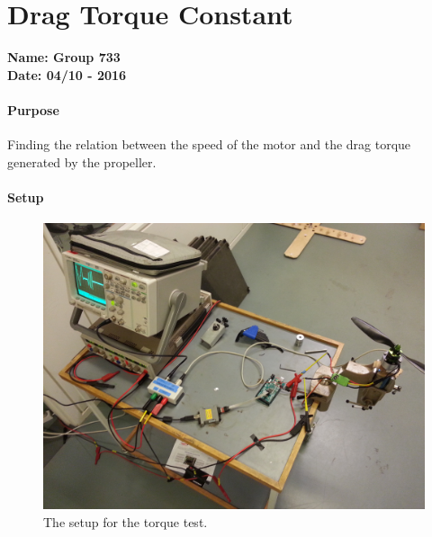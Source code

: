 \chapter{Drag Torque Constant}\label{app:TorqueTest} 
\textbf{Name: Group 733}\\
\textbf{Date: 04/10 - 2016}

\subsubsection{Purpose}
Finding the relation between the speed of the motor and the drag torque generated by the propeller.

\subsubsection{Setup}
\begin{figure}[H]
	\centering
	\includegraphics[scale=0.05]{figures/TorqueTestSetup}
	\caption{The setup for the torque test.}
	\label{TorqueTest}
\end{figure}

